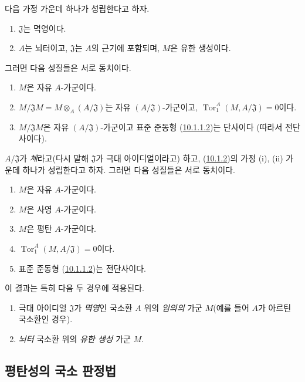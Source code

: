 \begin{env}[10.1.2]
\label{0.10.1.2-fr}
다음 가정 가운데 하나가 성립한다고 하자.
\begin{enumerate}
  \item[(i)] $\mathfrak{J}$는 멱영이다.
  \item[(ii)] $A$는 뇌터이고, $\mathfrak{J}$는 $A$의 근기에 포함되며,
    $M$은 유한 생성이다.
\end{enumerate}
그러면 다음 성질들은 서로 동치이다.
\begin{enumerate}
  \item[$a)$] $M$은 자유 $A$-가군이다.
  \item[$b)$] $M/\mathfrak{J}M=M\otimes_A(A/\mathfrak{J})$는 자유
    $(A/\mathfrak{J})$-가군이고,
    $\operatorname{Tor}_1^A(M,A/\mathfrak{J})=0$이다.
  \item[$c)$] $M/\mathfrak{J}M$은 자유 $(A/\mathfrak{J})$-가군이고
    표준 준동형 (\hyperref[0.10.1.1.2-fr]{10.1.1.2})는 단사이다
    (따라서 전단사이다).
\end{enumerate}
\end{env}

\begin{env}[10.1.3]
\label{0.10.1.3-fr}
$A/\mathfrak{J}$가 \emph{체}라고(다시 말해 $\mathfrak{J}$가 극대
아이디얼이라고) 하고, (\hyperref[0.10.1.2-fr]{10.1.2})의 가정 (i),
(ii) 가운데 하나가 성립한다고 하자. 그러면 다음 성질들은 서로 동치이다.
\begin{enumerate}
  \item[$a)$] $M$은 자유 $A$-가군이다.
  \item[$b)$] $M$은 사영 $A$-가군이다.
  \item[$c)$] $M$은 평탄 $A$-가군이다.
  \item[$d)$] $\operatorname{Tor}_1^A(M,A/\mathfrak{J})=0$이다.
  \item[$e)$] 표준 준동형
    (\hyperref[0.10.1.1.2-fr]{10.1.1.2})는 전단사이다.
\end{enumerate}
이 결과는 특히 다음 두 경우에 적용된다.
\begin{enumerate}
  \item[(i)] 극대 아이디얼 $\mathfrak{J}$가 \emph{멱영}인 국소환 $A$ 위의
    \emph{임의의} 가군 $M$(예를 들어 $A$가 아르틴 국소환인 경우).
  \item[(ii)] \emph{뇌터} 국소환 위의 \emph{유한 생성} 가군 $M$.
\end{enumerate}
\end{env}

\subsection{평탄성의 국소 판정법}
\label{subsection:0.10.2-fr}

